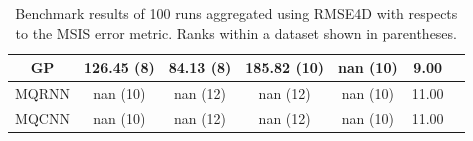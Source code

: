 \begin{table}[htb]
\begin{tabular}{ccccccc}
    GP          & 126.45 (8)                    & 84.13 (8)                     & \cellcolor{red!30}185.82 (10)  & \cellcolor{red!70}nan (10)     & 9.00                \\\hline
    MQRNN       & \cellcolor{red!70}nan (10)    & \cellcolor{red!70}nan (12)    & \cellcolor{red!70}nan (12)     & \cellcolor{red!70}nan (10)     & 11.00               \\\hline
    MQCNN       & \cellcolor{red!70}nan (10)    & \cellcolor{red!70}nan (12)    & \cellcolor{red!70}nan (12)     & \cellcolor{red!70}nan (10)     & 11.00               \\\hline
  \end{tabular}
  \caption{Benchmark results of 100 runs aggregated using RMSE4D with respects to the MSIS error metric. Ranks within a dataset shown in parentheses.}
  \label{tab:benchmark_results_msis}
\end{table}


